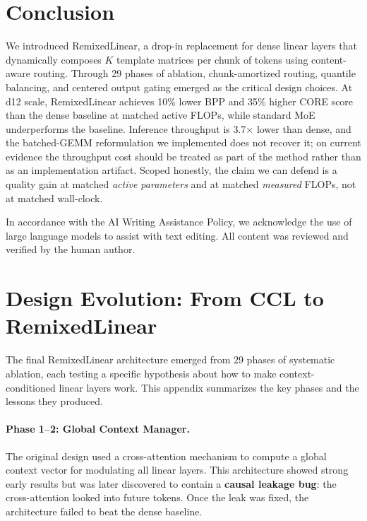 \documentclass{article}
\begin{document}
\section{Conclusion}

We introduced RemixedLinear, a drop-in replacement for dense linear layers that dynamically composes $K$ template matrices per chunk of tokens using content-aware routing. Through 29 phases of ablation, chunk-amortized routing, quantile balancing, and centered output gating emerged as the critical design choices. At d12 scale, RemixedLinear achieves 10\% lower BPP and 35\% higher CORE score than the dense baseline at matched active FLOPs, while standard MoE underperforms the baseline. Inference throughput is 3.7$\times$ lower than dense, and the batched-GEMM reformulation we implemented does not recover it; on current evidence the throughput cost should be treated as part of the method rather than as an implementation artifact. Scoped honestly, the claim we can defend is a quality gain at matched \emph{active parameters} and at matched \emph{measured} FLOPs, not at matched wall-clock.

\begin{ack}
In accordance with the AI Writing Assistance Policy, we acknowledge the use of large language models to assist with text editing. All content was reviewed and verified by the human author.
\end{ack}




\clearpage
\appendix
\section{Design Evolution: From CCL to RemixedLinear}
\label{app:evolution}

The final RemixedLinear architecture emerged from 29 phases of systematic ablation, each testing a specific hypothesis about how to make context-conditioned linear layers work. This appendix summarizes the key phases and the lessons they produced.

\paragraph{Phase 1--2: Global Context Manager.}
The original design used a cross-attention mechanism to compute a global context vector for modulating all linear layers. This architecture showed strong early results but was later discovered to contain a \textbf{causal leakage bug}: the cross-attention looked into future tokens. Once the leak was fixed, the architecture failed to beat the dense baseline.
\end{document}
